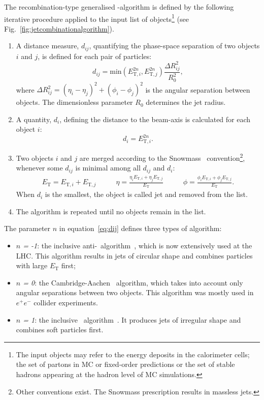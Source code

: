 The recombination-type generalised \kt-algorithm is defined by the following iterative procedure applied to the input list of objects\footnote{The input objects may refer to the energy deposits in the calorimeter cells; the set of partons in MC or fixed-order predictions or the set of stable hadrons appearing at the hadron level of MC simulations.} (see Fig.~\ref{fig:jetcombinationalgorithm}).
\begin{enumerate}
	\item A distance measure, $d_{ij}$, quantifying the phase-space separation of two objects $i$ and $j$, is defined for each pair of particles:
	\begin{equation}
	  d_{ij} = \mathrm{\text{min}} \left( E_{\text{T},i}^{2n}, E_{\text{T},j}^{2n} \right) \dfrac{\Delta R_{ij}^2}{R_0^2},
		\label{eq:dij}
	\end{equation}
	where $\Delta R_{ij}^2 = \left( \eta_{i} - \eta_{j} \right)^2 + \left( \phi_{i} - \phi_{j} \right)^2$ is the angular separation between objects. The dimensionless parameter $R_0$ determines the jet radius.
	\item A quantity, $d_i$, defining the distance to the beam-axis is calculated for each object $i$:
		\begin{equation}
	  d_{i} = E_{\text{T},i}^{2n}.
		\label{eq:di}
	\end{equation}
	\item Two objects $i$ and $j$ are merged according to the Snowmass~\cite{proc:snowmass:1990:134} convention\footnote{Other conventions exist. The Snowmass prescription results in massless jets.}, whenever some $d_{ij}$ is minimal among all $d_{ij}$ and $d_{i}$:
	\begin{align}
		E_\text{T} = E_{\text{T},i} + E_{\text{T},j} & \qquad \eta = \frac{\eta_iE_{\text{T},i} + \eta_jE_{\text{T},j}}{E_\text{T}} & \qquad \phi = \frac{\phi_iE_{\text{T},i} + \phi_jE_{\text{T},j}}{E_\text{T}}.			 \label{eq:snowmass}
	\end{align}
	When $d_i$ is the smallest, the object is called jet and removed from the list.
	\item The algorithm is repeated until no objects remain in the list.
\end{enumerate}
The parameter $n$ in equation~\ref{eq:dij} defines three types of algorithm:
\begin{itemize}
	\item \textsl{$n$ = -1}: the inclusive anti-\kt~algorithm~\cite{Cacciari:2008gp}, which is now extensively used at the LHC. This algorithm results in jets of circular shape and combines particles with large $E_\text{T}$ first;
	\item \textsl{$n$ = 0}: the Cambridge-Aachen~\cite{Dokshitzer:1997in} algorithm, which takes into account only angular separations between two objects.  This algorithm was mostly used in $e^+e^-$ collider experiments.
	\item \textsl{$n$ = 1}: the inclusive \kt~algorithm~\cite{Catani:1993hr}. It produces jets of irregular shape and combines soft particles first.
\end{itemize}
